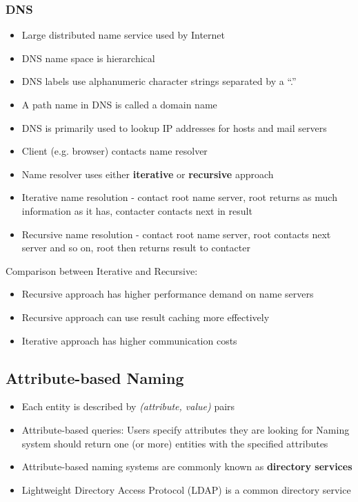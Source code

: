 \subsubsection{DNS}
\begin{itemize}
	\item Large distributed name service used by Internet
	\item DNS name space is hierarchical
	\item DNS labels use alphanumeric character strings separated by a ``.''
	\item A path name in DNS is called a domain name
	\item DNS is primarily used to lookup IP addresses for hosts and mail servers
	\item Client (e.g. browser) contacts name resolver
	\item Name resolver uses either \textbf{iterative} or \textbf{recursive} approach
	\item Iterative name resolution - contact root name server, root returns as much information as it has, contacter contacts next in result
	\item Recursive name resolution - contact root name server, root contacts next server and so on, root then returns result to contacter
\end{itemize}
Comparison between Iterative and Recursive:
\begin{itemize}
	\item Recursive approach has higher performance demand on name servers
	\item Recursive approach can use result caching more effectively
	\item Iterative approach has higher communication costs	
\end{itemize}

\subsection{Attribute-based Naming}
\begin{itemize}
	\item Each entity is described by \textit{(attribute, value)} pairs
	\item Attribute-based queries:
	\subitem Users specify attributes they are looking for
	\subitem Naming system should return one (or more) entities with the specified attributes
	\item Attribute-based naming systems are commonly known as \textbf{directory services}
	\item Lightweight Directory Access Protocol (LDAP) is a common directory service	
\end{itemize}

